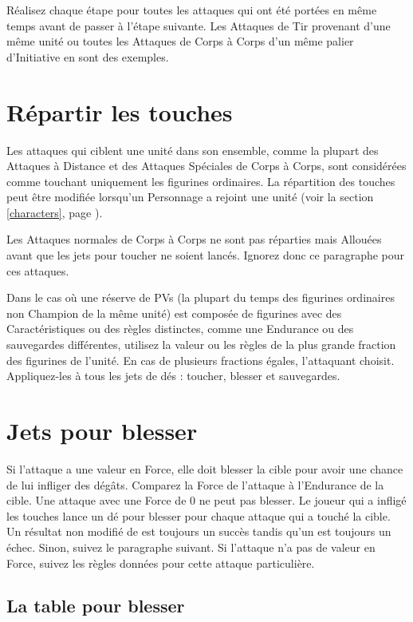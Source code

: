 Réalisez chaque étape pour toutes les attaques qui ont été portées en même temps avant de passer à l'étape suivante. Les Attaques de Tir provenant d'une même unité ou toutes les Attaques de Corps à Corps d'un même palier d'Initiative en sont des exemples.

\newpage
\hypertarget{distributehits}{\section{Répartir les touches}}

Les attaques qui ciblent une unité dans son ensemble, comme la plupart des Attaques à Distance et des Attaques Spéciales de Corps à Corps, sont considérées comme touchant uniquement les figurines ordinaires. La répartition des touches peut être modifiée lorsqu'un Personnage a rejoint une unité (voir la section \ref{characters}, page \pageref{characters}).

Les Attaques normales de Corps à Corps ne sont pas réparties mais Allouées avant que les jets pour toucher ne soient lancés. Ignorez donc ce paragraphe pour ces attaques. 

Dans le cas où une réserve de PVs (la plupart du temps des figurines ordinaires non Champion de la même unité) est composée de figurines avec des Caractéristiques ou des règles distinctes, comme une Endurance ou des sauvegardes différentes, utilisez la valeur ou les règles de la plus grande fraction des figurines de l'unité. En cas de plusieurs fractions égales, l'attaquant choisit. Appliquez-les à tous les jets de dés : toucher, blesser et sauvegardes.

\hypertarget{towoundrolls}{\section{Jets pour blesser}}

Si l'attaque a une valeur en Force, elle doit blesser la cible pour avoir une chance de lui infliger des dégâts. Comparez la Force de l'attaque à l'Endurance de la cible. Une attaque avec une Force de 0 ne peut pas blesser. Le joueur qui a infligé les touches lance un dé pour blesser pour chaque attaque qui a touché la cible. Un résultat non modifié de  est toujours un succès tandis qu'un  est toujours un échec. Sinon, suivez le paragraphe suivant. Si l'attaque n'a pas de valeur en Force, suivez les règles données pour cette attaque particulière. 

\subsection{La table pour blesser}

